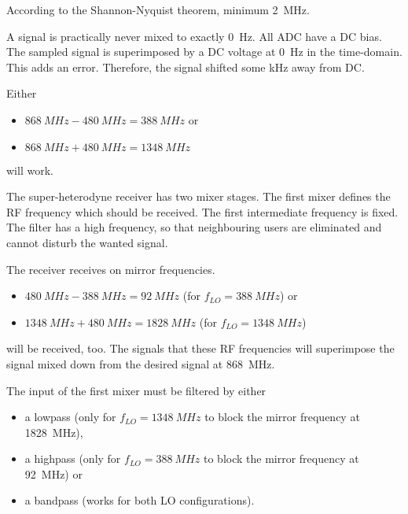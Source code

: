 \begin{solution}
	\begin{tasks}
		\task
		According to the Shannon-Nyquist theorem, minimum \SI{2}{MHz}.
		
		\begin{remark}
			A signal is practically never mixed to exactly \SI{0}{Hz}. All ADC have a DC bias. The sampled signal is superimposed by a DC voltage at \SI{0}{Hz} in the time-domain. This adds an error. Therefore, the signal shifted some \si{kHz} away from DC.
		\end{remark}
		
		\task
		Either
		\begin{itemize}
			\item $\SI{868}{MHz} - \SI{480}{MHz} = \SI{388}{MHz}$ or
			\item $\SI{868}{MHz} + \SI{480}{MHz} = \SI{1348}{MHz}$
		\end{itemize}
		will work.
		
		\begin{remark}
			The super-heterodyne receiver has two mixer stages. The first mixer defines the RF frequency which should be received. The first intermediate frequency is fixed. The filter has a high frequency, so that neighbouring users are eliminated and cannot disturb the wanted signal.
		\end{remark}
		
		\task
		The receiver receives on mirror frequencies.
		\begin{itemize}
			\item $\SI{480}{MHz} - \SI{388}{MHz} = \SI{92}{MHz}$ (for $f_{LO} = \SI{388}{MHz}$) or
			\item $\SI{1348}{MHz} + \SI{480}{MHz} = \SI{1828}{MHz}$ (for $f_{LO} = \SI{1348}{MHz}$)
		\end{itemize}
		will be received, too. The signals that these RF frequencies will superimpose the signal mixed down from the desired signal at \SI{868}{MHz}.
		
		The input of the first mixer must be filtered by either
		\begin{itemize}
			\item a lowpass (only for $f_{LO} = \SI{1348}{MHz}$ to block the mirror frequency at \SI{1828}{MHz}),
			\item a highpass (only for $f_{LO} = \SI{388}{MHz}$ to block the mirror frequency at \SI{92}{MHz}) or
			\item a bandpass (works for both LO configurations).
		\end{itemize}
	\end{tasks}
\end{solution}

